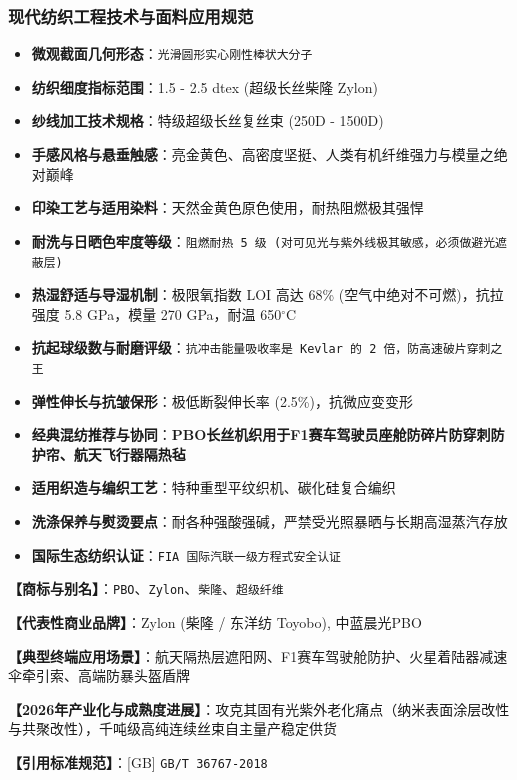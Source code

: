 \documentclass[11pt,openright,twoside,UTF8]{ctexbook}
\begin{document}
\subsubsection*{现代纺织工程技术与面料应用规范}
\begin{itemize} \setlength{\itemsep}{2pt}
    \item \textbf{微观截面几何形态}：\texttt{光滑圆形实心刚性棒状大分子}
    \item \textbf{纺织细度指标范围}：1.5 - 2.5 dtex (超级长丝柴隆 Zylon)
    \item \textbf{纱线加工技术规格}：特级超级长丝复丝束 (250D - 1500D)
    \item \textbf{手感风格与悬垂触感}：亮金黄色、高密度坚挺、人类有机纤维强力与模量之绝对巅峰
    \item \textbf{印染工艺与适用染料}：天然金黄色原色使用，耐热阻燃极其强悍
    \item \textbf{耐洗与日晒色牢度等级}：\texttt{阻燃耐热 5 级 (对可见光与紫外线极其敏感，必须做避光遮蔽层)}
    \item \textbf{热湿舒适与导湿机制}：极限氧指数 LOI 高达 68\% (空气中绝对不可燃)，抗拉强度 5.8 GPa，模量 270 GPa，耐温 650$^\circ\mathrm{C}$
    \item \textbf{抗起球级数与耐磨评级}：\texttt{抗冲击能量吸收率是 Kevlar 的 2 倍，防高速破片穿刺之王}
    \item \textbf{弹性伸长与抗皱保形}：极低断裂伸长率 (2.5\%)，抗微应变变形
    \item \textbf{经典混纺推荐与协同}：\textbf{PBO长丝机织用于F1赛车驾驶员座舱防碎片防穿刺防护帘、航天飞行器隔热毡}
    \item \textbf{适用织造与编织工艺}：特种重型平纹织机、碳化硅复合编织
    \item \textbf{洗涤保养与熨烫要点}：耐各种强酸强碱，严禁受光照暴晒与长期高湿蒸汽存放
    \item \textbf{国际生态纺织认证}：\texttt{FIA 国际汽联一级方程式安全认证}
\end{itemize}
\vspace{0.2cm}

\noindent\textbf{【商标与别名】}：\texttt{PBO}、\texttt{Zylon}、\texttt{柴隆}、\texttt{超级纤维}\par
\noindent\textbf{【代表性商业品牌】}：Zylon (柴隆 / 东洋纺 Toyobo), 中蓝晨光PBO\par
\noindent\textbf{【典型终端应用场景】}：航天隔热层遮阳网、F1赛车驾驶舱防护、火星着陆器减速伞牵引索、高端防暴头盔盾牌\par
\noindent\textbf{【2026年产业化与成熟度进展】}：攻克其固有光紫外老化痛点（纳米表面涂层改性与共聚改性），千吨级高纯连续丝束自主量产稳定供货\par
\noindent\textbf{【引用标准规范】}：[GB] \texttt{GB/T 36767-2018}\par
\vspace{0.5cm}
\end{document}
